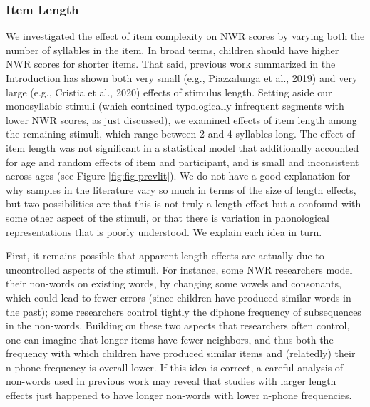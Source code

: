 \documentclass[english,,man,floatsintext]{apa6}
\begin{document}
\hypertarget{item-length}{%
\subsubsection{Item Length}\label{item-length}}

We investigated the effect of item complexity on NWR scores by varying both the number of syllables in the item. In broad terms, children should have higher NWR scores for shorter items. That said, previous work summarized in the Introduction has shown both very small (e.g., Piazzalunga et al., 2019) and very large (e.g., Cristia et al., 2020) effects of stimulus length. Setting aside our monosyllabic stimuli (which contained typologically infrequent segments with lower NWR scores, as just discussed), we examined effects of item length among the remaining stimuli, which range between 2 and 4 syllables long. The effect of item length was not significant in a statistical model that additionally accounted for age and random effects of item and participant, and is small and inconsistent across ages (see Figure \ref{fig:fig-prevlit}). We do not have a good explanation for why samples in the literature vary so much in terms of the size of length effects, but two possibilities are that this is not truly a length effect but a confound with some other aspect of the stimuli, or that there is variation in phonological representations that is poorly understood. We explain each idea in turn.

First, it remains possible that apparent length effects are actually due to uncontrolled aspects of the stimuli. For instance, some NWR researchers model their non-words on existing words, by changing some vowels and consonants, which could lead to fewer errors (since children have produced similar words in the past); some researchers control tightly the diphone frequency of subsequences in the non-words. Building on these two aspects that researchers often control, one can imagine that longer items have fewer neighbors, and thus both the frequency with which children have produced similar items and (relatedly) their n-phone frequency is overall lower. If this idea is correct, a careful analysis of non-words used in previous work may reveal that studies with larger length effects just happened to have longer non-words with lower n-phone frequencies.
\end{document}
